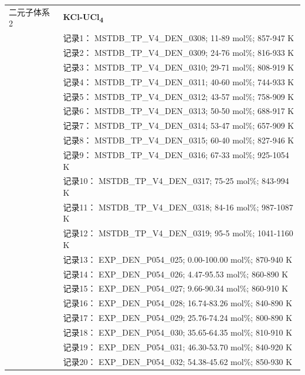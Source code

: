 \documentclass[12pt]{article}
\begin{document}
{\begin{longtable}[]{@{}
  >{\raggedright\arraybackslash}p{}
  >{\raggedright\arraybackslash}p{}@{}}
二元子体系 2  & \textbf{KCl-UCl\textsubscript{4}} \\
 & 记录1： MSTDB\_TP\_V4\_DEN\_0308; 11-89 mol\%; 857-947 K \\
 & 记录2： MSTDB\_TP\_V4\_DEN\_0309; 24-76 mol\%; 816-933 K \\
 & 记录3： MSTDB\_TP\_V4\_DEN\_0310; 29-71 mol\%; 808-919 K \\
 & 记录4： MSTDB\_TP\_V4\_DEN\_0311; 40-60 mol\%; 744-933 K \\
 & 记录5： MSTDB\_TP\_V4\_DEN\_0312; 43-57 mol\%; 758-909 K \\
 & 记录6： MSTDB\_TP\_V4\_DEN\_0313; 50-50 mol\%; 688-917 K \\
 & 记录7： MSTDB\_TP\_V4\_DEN\_0314; 53-47 mol\%; 657-909 K \\
 & 记录8： MSTDB\_TP\_V4\_DEN\_0315; 60-40 mol\%; 827-946 K \\
 & 记录9： MSTDB\_TP\_V4\_DEN\_0316; 67-33 mol\%; 925-1054 K \\
 & 记录10： MSTDB\_TP\_V4\_DEN\_0317; 75-25 mol\%; 843-994 K \\
 & 记录11： MSTDB\_TP\_V4\_DEN\_0318; 84-16 mol\%; 987-1087 K \\
 & 记录12： MSTDB\_TP\_V4\_DEN\_0319; 95-5 mol\%; 1041-1160 K \\
 & 记录13： EXP\_DEN\_P054\_025; 0.00-100.00 mol\%; 870-940 K \\
 & 记录14： EXP\_DEN\_P054\_026; 4.47-95.53 mol\%; 860-890 K \\
 & 记录15： EXP\_DEN\_P054\_027; 9.66-90.34 mol\%; 860-910 K \\
 & 记录16： EXP\_DEN\_P054\_028; 16.74-83.26 mol\%; 840-890 K \\
 & 记录17： EXP\_DEN\_P054\_029; 25.76-74.24 mol\%; 800-890 K \\
 & 记录18： EXP\_DEN\_P054\_030; 35.65-64.35 mol\%; 810-910 K \\
 & 记录19： EXP\_DEN\_P054\_031; 46.30-53.70 mol\%; 840-920 K \\
 & 记录20： EXP\_DEN\_P054\_032; 54.38-45.62 mol\%; 850-930 K  \\


\end{longtable}}
\end{document}
